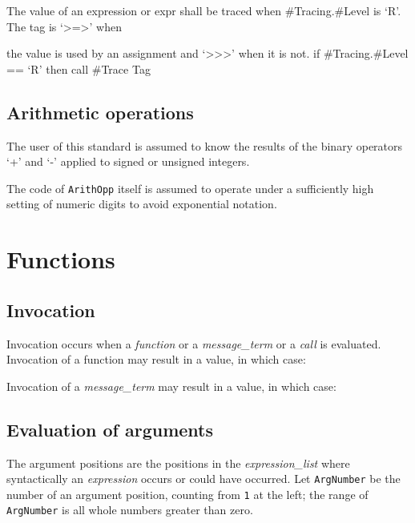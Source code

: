 The value of an expression or expr shall be traced when
\#Tracing.\#Level is `R'. The tag is `\textgreater=\textgreater{}' when

the value is used by an assignment and
`\textgreater\textgreater\textgreater{}' when it is not. if
\#Tracing.\#Level == `R' then call \#Trace Tag

\subsection{Arithmetic operations}\label{arithmetic-operations}

The user of this standard is assumed to know the results of the binary
operators `+' and `-' applied to signed or unsigned integers.

The code of \texttt{ArithOpp} itself is assumed to operate under a
sufficiently high setting of numeric digits to avoid exponential
notation.



\section{Functions}\label{functions}

\subsection{Invocation}\label{invocation}

Invocation occurs when a \emph{function} or a \emph{message\_term} or a
\emph{call} is evaluated. Invocation of a function may result in a
value, in which case:



Invocation of a \emph{message\_term} may result in a value, in which
case:



\subsection{Evaluation of arguments}\label{evaluation-of-arguments}

The argument positions are the positions in the \emph{expression\_list}
where syntactically an \emph{expression} occurs or could have occurred.
Let \texttt{ArgNumber} be the number of an argument position, counting
from \texttt{1} at the left; the range of \texttt{ArgNumber} is all
whole numbers greater than zero.

